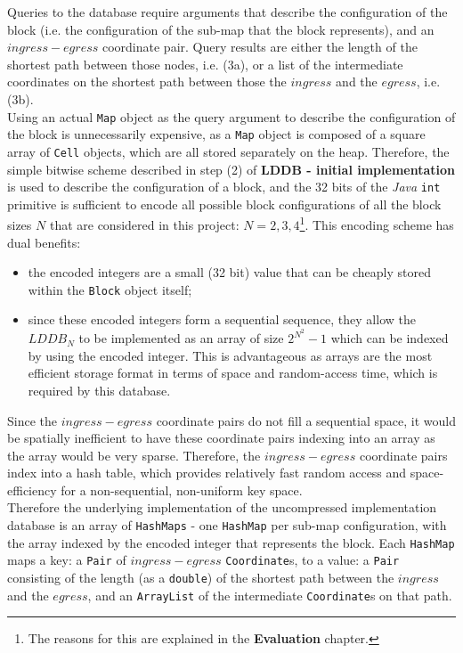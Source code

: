\documentclass[12pt,notitlepage]{report}
\begin{document}
\noindent
Queries to the database require arguments that describe the configuration of the block (i.e. the configuration of the sub-map that the block represents), and an $ingress-egress$ coordinate pair. Query results are either the length of the shortest path between those nodes, i.e. (3a), or a list of the intermediate coordinates on the shortest path between those the $ingress$ and the $egress$, i.e. (3b).\\

\noindent
Using an actual {\tt Map} object as the query argument to describe the configuration of the block is unnecessarily expensive, as a {\tt Map} object is composed of a square array of {\tt Cell} objects, which are all stored separately on the heap. Therefore, the simple bitwise scheme described in step (2) of {\bfseries LDDB - initial implementation} is used to describe the configuration of a block, and the 32 bits of the {\em Java} {\tt int} primitive is sufficient to encode all possible block configurations of all the block sizes $N$ that are considered in this project: $N=2, 3, 4$\footnote{The reasons for this are explained in the {\bfseries Evaluation} chapter.}. This encoding scheme has dual benefits:
\begin{itemize}
\item the encoded integers are a small (32 bit) value that can be cheaply stored within the {\tt Block} object itself;
\item since these encoded integers form a sequential sequence, they allow the $LDDB_{N}$ to be implemented as an array of size $2^{N^{2}}-1$ which can be indexed by using the encoded integer. This is advantageous as arrays are the most efficient storage format in terms of space and random-access time, which is required by this database.
\end{itemize}

\noindent
Since the $ingress-egress$ coordinate pairs do not fill a sequential space, it would be spatially inefficient to have these coordinate pairs indexing into an array as the array would be very sparse. Therefore, the $ingress-egress$ coordinate pairs index into a hash table, which provides relatively fast random access and space-efficiency for a non-sequential, non-uniform key space.\\

\noindent
Therefore the underlying implementation of the uncompressed implementation database is an array of {\tt  HashMaps} - one {\tt HashMap} per sub-map configuration, with the array indexed by the encoded integer that represents the block. Each {\tt HashMap} maps a key: a {\tt Pair} of $ingress-egress$ {\tt Coordinate}s, to a value: a {\tt Pair} consisting of the length (as a {\tt double}) of the shortest path between the $ingress$ and the $egress$, and an {\tt ArrayList} of the intermediate {\tt Coordinate}s on that path.\\
\end{document}
